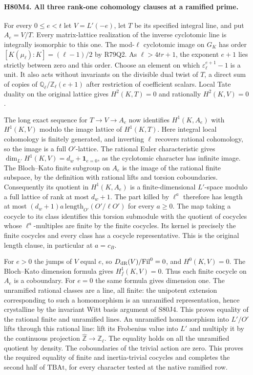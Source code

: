 \paragraph{H80M4. All three rank-one cohomology clauses at a ramified prime.}
For every $0\le e<t$ let $V=L'(-e)$, let $T$ be its specified
integral line, and put $A_e=V/T$. Every matrix-lattice realization
of the inverse cyclotomic line is integrally isomorphic to this one.
The mod-$\ell$ cyclotomic image on $G_K$ has order
$[K(\mu_\ell):K]=(\ell-1)/2$ by R79Q2. As $\ell>4tr+1$, the
exponent $e+1$ lies strictly between zero and this order.
Choose an element on which $\varepsilon_\ell^{e+1}-1$ is a unit.
It also acts without invariants on the divisible dual twist of $T$,
a direct sum of copies of $\mathbb Q_\ell/\mathbb Z_\ell(e+1)$
after restriction of coefficient scalars. Local Tate duality on
the original lattice gives $H^2(K,T)=0$ and rationally
$H^2(K,V)=0$.

The long exact sequence for $T\to V\to A_e$ now identifies
$H^1(K,A_e)$ with $H^1(K,V)$ modulo the image lattice of $H^1(K,T)$.
Here integral local cohomology is finitely generated, and inverting
$\ell$ recovers rational cohomology, so the image is a full
$O'$-lattice. The rational Euler characteristic gives
$\dim_{L'}H^1(K,V)=d_w+\mathbf1_{e=0}$, as the cyclotomic
character has infinite image. The Bloch--Kato finite subgroup
on $A_e$ is the image of the rational finite subspace, by the
definition with rational lifts and torsion coboundaries.
Consequently its quotient in $H^1(K,A_e)$ is a finite-dimensional
$L'$-space modulo a full lattice of rank at most $d_w+1$.
The part killed by $\ell^a$ therefore has length at most
$(d_w+1)a\,\mathrm{length}_{O'}(O'/\ell O')$ for every $a\ge0$.
The map taking a cocycle to its class identifies this torsion
submodule with the quotient of cocycles whose $\ell^a$-multiples
are finite by the finite cocycles. Its kernel is precisely the
finite cocycles and every class has a cocycle representative.
This is the original length clause, in particular at $a=c_B$.

For $e>0$ the jumps of $V$ equal $e$, so
$D_{\rm dR}(V)/\mathrm{Fil}^0=0$, and $H^0(K,V)=0$.
The Bloch--Kato dimension formula gives $H_f^1(K,V)=0$.
Thus each finite cocycle on $A_e$ is a coboundary.
For $e=0$ the same formula gives dimension one. The unramified
rational classes are a line, all finite: the unipotent extension
corresponding to such a homomorphism is an unramified representation,
hence crystalline by the invariant Witt basis argument of S80J4.
This proves equality of the rational finite and unramified lines.
An unramified homomorphism into $L'/O'$ lifts through this rational
line: lift its Frobenius value into $L'$ and multiply it by the
continuous projection $\widehat{\mathbb Z}\to\mathbb Z_\ell$.
The equality holds on all the unramified quotient by density.
The coboundaries of the trivial action are zero. This proves the
required equality of finite and inertia-trivial cocycles and
completes the second half of $\mathrm{TBAt}$, for every character
tested at the native ramified row.

